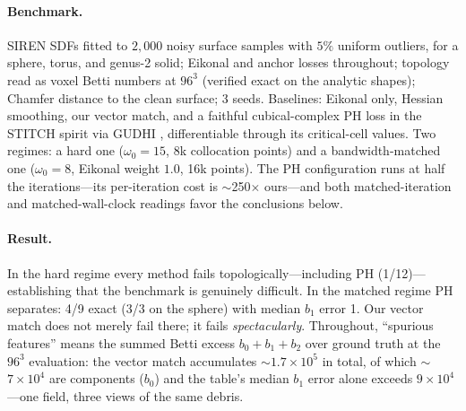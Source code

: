 \documentclass[10pt]{article}
\begin{document}
\paragraph{Benchmark.} SIREN SDFs fitted to $2{,}000$ noisy surface samples with
$5\%$ uniform outliers, for a sphere, torus, and genus-2 solid; Eikonal and anchor
losses throughout; topology read as voxel Betti numbers at $96^3$ (verified exact on
the analytic shapes); Chamfer distance to the clean surface; 3 seeds. Baselines:
Eikonal only, Hessian smoothing, our vector match, and a faithful cubical-complex PH
loss in the STITCH spirit \citep{stitch2024} via GUDHI \citep{gudhi}, differentiable
through its critical-cell values. Two regimes: a hard one
($\omega_0{=}15$, 8k collocation points) and a bandwidth-matched one
($\omega_0{=}8$, Eikonal weight $1.0$, 16k points). The PH configuration runs at half
the iterations---its per-iteration cost is $\sim$250$\times$ ours---and both
matched-iteration and matched-wall-clock readings favor the conclusions below.

\begin{table}[t]
\centering
\caption{\textbf{3D SDF benchmark} (3 shapes $\times$ 3 seeds per regime; ``topo
correct'' = exact Betti numbers $(b_0,b_1,b_2)$ at $96^3$). PH runs at half
iterations; its topo cost is per-iteration.}
\label{tab:exp10}

\end{table}

\paragraph{Result.} In the hard regime every method fails topologically---including
PH (1/12)---establishing that the benchmark is genuinely difficult. In the matched
regime PH separates: 4/9 exact (3/3 on the sphere) with median $b_1$ error 1. Our
vector match does not merely fail there; it fails \emph{spectacularly}. Throughout,
``spurious features'' means the summed Betti excess $b_0{+}b_1{+}b_2$ over ground
truth at the $96^3$ evaluation: the vector match accumulates $\sim$$1.7\times10^5$ in
total, of which $\sim$$7\times10^4$ are components ($b_0$) and the table's median
$b_1$ error alone exceeds $9\times10^4$---one field, three views of the same debris.
\end{document}
